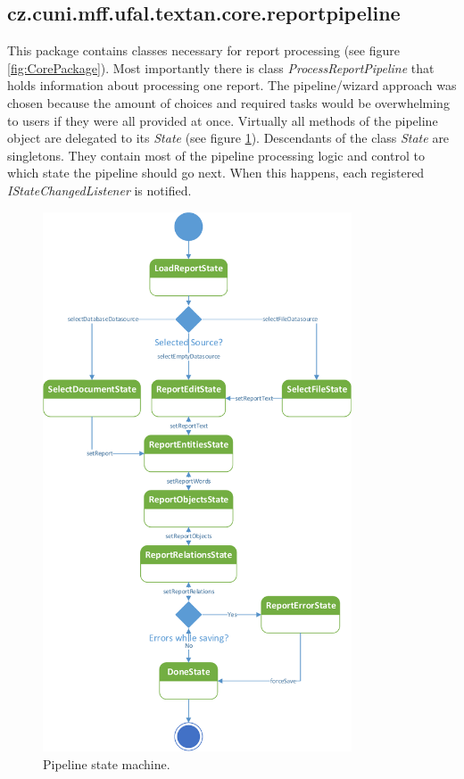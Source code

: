 \subsection{cz.cuni.mff.ufal.textan.core.reportpipeline}
\label{sssec:ReportPipeline}

This package contains classes necessary for report processing (see figure
\ref{fig:CorePackage}). Most importantly there is class
\emph{ProcessReportPipeline} that holds information about processing one report.
The pipeline/wizard approach was chosen because the amount of choices and
required tasks would be overwhelming to users if they were all provided at once.
Virtually all methods of the pipeline object are delegated to its \emph{State}
(see figure \ref{fig:Pipeline}). Descendants of the class \emph{State} are
singletons. They contain most of the pipeline processing logic and control to
which state the pipeline should go next. When this happens, each registered
\emph{IStateChangedListener} is notified.

\begin{figure}[!htb]
        \centering
        \includegraphics[height=16cm]{Images/Pipeline}
        \caption{Pipeline state machine.}
        \label{fig:Pipeline}
\end{figure}


